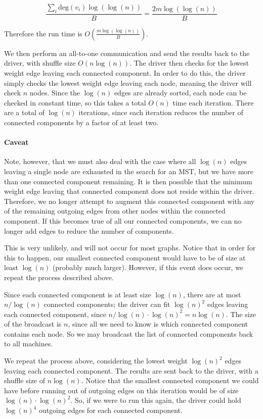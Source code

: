 \documentclass[12pt]{article}
\begin{document}
\[
\frac{\sum_{i} \text{deg}(v_i) \log(\log(n))}{B} = \frac{2m \log(\log(n))}{B}
\]

Therefore the run time is $O(\frac{m \log(\log(n))}{B})$.

We then perform an all-to-one communication and send the results back to the driver, with shuffle size $O(n \log(n))$. The driver then checks for the lowest weight edge leaving each connected component. In order to do this, the driver simply checks the lowest weight edge leaving each node, meaning the driver will check $n$ nodes. Since the $\log(n)$ edges are already sorted, each node can be checked in constant time, so this takes a total $O(n)$ time each iteration. There are a total of $\log(n)$ iterations, since each iteration reduces the number of connected components by a factor of at least two. 

\paragraph{Caveat} 

Note, however, that we must also deal with the case where all $\log(n)$ edges leaving a single node are exhausted in the search for an MST, but we have more than one connected component remaining. It is then possible that the minimum weight edge leaving that connected component does not reside within the driver. Therefore, we no longer attempt to augment this connected component with any of the remaining outgoing edges from other nodes within the connected component. If this becomes true of all our connected components, we can no longer add edges to reduce the number of components. 

This is very unlikely, and will not occur for most graphs. Notice that in order for this to happen, our smallest connected component would have to be of size at least $\log(n)$ (probably much larger). However, if this event does occur, we repeat the process described above. 

Since each connected component is at least size $\log(n)$, there are at most $n/ \log(n)$ connected components; the driver can fit $\log(n)^2$ edges leaving each connected component, since $n/\log(n) \cdot \log(n)^2 = n \log(n)$. The size of the broadcast is $n$, since all we need to know is which connected component contains each node. So we may broadcast the list of connected components back to all machines. 

We repeat the process above, considering the lowest weight $\log(n)^{2}$ edges leaving each connected component. The results are sent back to the driver, with a shuffle size of $n \log (n)$. Notice that the smallest connected component we could have before running out of outgoing edges on this iteration would be of size $\log(n) \cdot \log(n)^2$. So, if we were to run this again, the driver could hold $\log(n)^4$ outgoing edges for each connected component.
\end{document}

